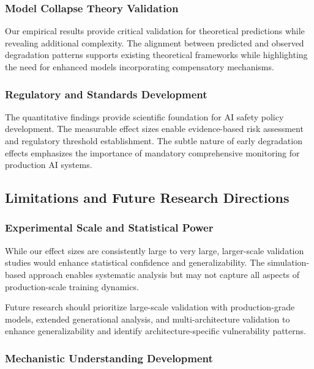 \documentclass[11pt]{article}
\begin{document}
\subsubsection{Model Collapse Theory Validation}

Our empirical results provide critical validation for theoretical predictions while revealing additional complexity. The alignment between predicted and observed degradation patterns supports existing theoretical frameworks while highlighting the need for enhanced models incorporating compensatory mechanisms.

\subsubsection{Regulatory and Standards Development}

The quantitative findings provide scientific foundation for AI safety policy development. The measurable effect sizes enable evidence-based risk assessment and regulatory threshold establishment. The subtle nature of early degradation effects emphasizes the importance of mandatory comprehensive monitoring for production AI systems.

\subsection{Limitations and Future Research Directions}

\subsubsection{Experimental Scale and Statistical Power}

While our effect sizes are consistently large to very large, larger-scale validation studies would enhance statistical confidence and generalizability. The simulation-based approach enables systematic analysis but may not capture all aspects of production-scale training dynamics.

Future research should prioritize large-scale validation with production-grade models, extended generational analysis, and multi-architecture validation to enhance generalizability and identify architecture-specific vulnerability patterns.

\subsubsection{Mechanistic Understanding Development}
\end{document}
